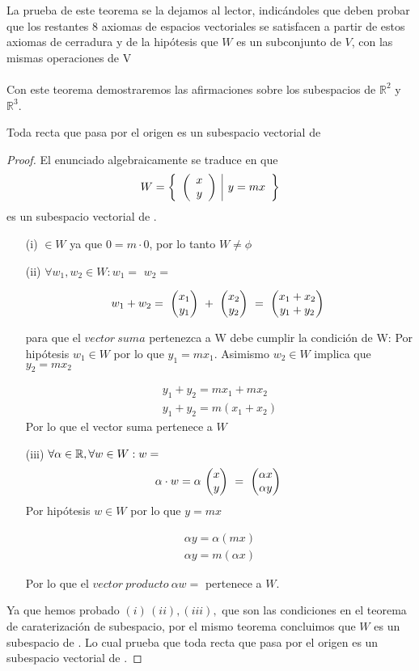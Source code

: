La prueba de este teorema se la dejamos al lector, indic\'andoles que deben probar que los restantes 8 axiomas de espacios vectoriales se satisfacen a partir de estos axiomas de cerradura y de la hip\'otesis que $W$ es un subconjunto de $V$, con las mismas operaciones de V
\\
\\
Con este teorema demostraremos las afirmaciones sobre los subespacios de $\mathbb{R}^2$ y 
$\mathbb{R}^3$.

\begin{theorem}
 Toda recta que pasa por el origen es un subespacio vectorial de \rdos

\end{theorem}
\begin{proof}

El enunciado algebraicamente se traduce en que $$W= \left\{\begin{array}{c|c} {\left( \begin{array}{c} x\\ y \end{array}\right) }&{y=mx} \end{array} \right\}$$
es un subespacio vectorial de \rdos.
\begin{enumerate}


\item[(i)]  $\in W$ ya que $0=m\cdot 0$, por lo tanto $W\neq \phi$ 

\item[(ii)] $\forall w_1, w_2 \in W: w_1=$ 
 $w_2=$

\[
w_1+w_2=\mbox{ \ensuremath{\begin{pmatrix} x_1\\ y_1\\ \end{pmatrix} } }+\mbox{ \ensuremath{\begin{pmatrix} x_2\\ y_2\\ \end{pmatrix} } }=
\mbox{ \ensuremath{\begin{pmatrix} x_1+x_2\\ y_1+y_2\\ \end{pmatrix} } }
\]

para que el $vector\ suma$ pertenezca a W debe cumplir la condici{\'o}n de W:
Por hip{\'o}tesis $w_1 \in W $ por lo que $y_1=mx_1$. Asimismo $w_2 \in W$ implica que
$y_2=mx_2$

\[
\begin{array}{c}

y_1+y_2=mx_1+mx_2
\\
y_1+y_2=m\left(x_1+x_2\right)
\end{array}
\]
Por lo que el vector suma pertenece a $W$

\item[(iii)] $\forall \alpha \in \mbox{\ensuremath{\mathbb{R}}}, \forall w \in W: w=$
\[
\alpha\cdot w=\alpha\mbox{ \ensuremath{\begin{pmatrix} x\\ y\\ \end{pmatrix} } }=
\mbox{ \ensuremath{\begin{pmatrix} \alpha x\\ \alpha y\\ \end{pmatrix} } }
\]
Por hip\'otesis $w\in W$ por lo que $y=mx$

\[\begin{array}{c}
\alpha y=\alpha\left(mx\right)
\\
\alpha y=m\left( \alpha x\right)
\end{array}
\]

Por lo que el $vector\ producto\ \alpha w=$ pertenece a $W$.

\end{enumerate}
Ya que hemos probado $\left( i\right)\, \left(ii\right), \left(iii\right),$ que son las condiciones en el teorema de caraterizaci\'on de subespacio, por el mismo teorema concluimos que $W$ es un subespacio de \rdos. Lo cual prueba que toda recta que pasa por el origen es un subespacio vectorial de \rdos.

\end{proof}


